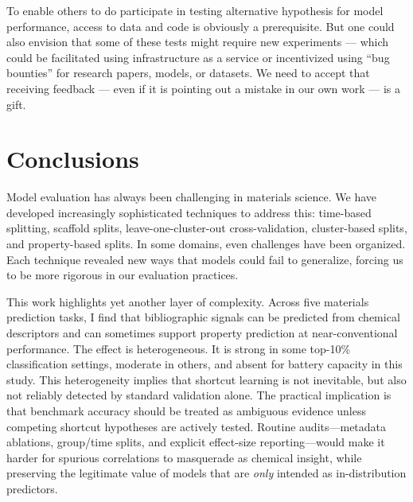 \documentclass[11pt, oneside]{article}
\begin{document}
To enable others to do participate in testing alternative hypothesis for model performance, access to data and code is obviously a prerequisite. But one could also envision that some of these tests might require new experiments --- which could be facilitated using infrastructure as a service or incentivized using \enquote{bug bounties} for research papers, models, or datasets. We need to accept that receiving feedback --- even if it is pointing out a mistake in our own work --- is a gift.

\section{Conclusions}

Model evaluation has always been challenging in materials science.\autocite{Alampara2025} 
We have developed increasingly sophisticated techniques to address this: time-based splitting,\autocite{sheridan2013time, Landrum2023} scaffold splits, leave-one-cluster-out cross-validation,\autocite{Durdy2022, Meredig2018} cluster-based splits,\autocite{guo2024scaffold} and property-based splits.\autocite{Jablonka2023, kunchapu2025polymetrix} 
In some domains, even challenges have been organized.\autocite{Moult2005, Tetko2024, Llinas2019}
Each technique revealed new ways that models could fail to generalize, forcing us to be more rigorous in our evaluation practices.

This work highlights yet another layer of complexity. 
Across five materials prediction tasks, I find that bibliographic signals can be predicted from chemical descriptors and can sometimes support property prediction at near-conventional performance. The effect is heterogeneous. It is strong in some top-10\% classification settings, moderate in others, and absent for battery capacity in this study. This heterogeneity implies that shortcut learning is not inevitable, but also not reliably detected by standard validation alone.
The practical implication is that benchmark accuracy should be treated as ambiguous evidence unless competing shortcut hypotheses are actively tested. Routine audits—metadata ablations, group/time splits, and explicit effect-size reporting—would make it harder for spurious correlations to masquerade as chemical insight, while preserving the legitimate value of models that are \emph{only} intended as in-distribution predictors.

\end{document}
